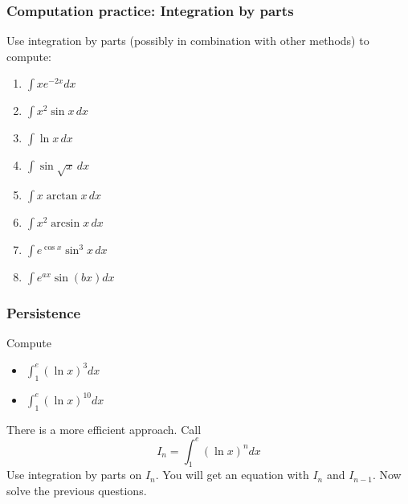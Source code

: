 \documentclass[14pt]{beamer}
\newcommand {\DS} [1] {${\displaystyle #1}$}
\newcommand{\p}{\pause}
\newcommand{\vv}{\vspace{.2cm}}
\begin{document}
\begin{frame}[t]
\frametitle{Computation practice: Integration by parts}

Use integration by parts (possibly in combination with other methods) to compute:
\begin{multicols}{2}
	\begin{enumerate}
		\item  \DS{ \int x e^{-2x} dx }
		\vv
		\item \DS{\int x^2 \sin x \, dx}
		\vv
		\item \DS{\int  \ln x \, dx}
		\vv
		\item \DS{\int  \sin \sqrt{x} \, dx}
		\vv
\p		\item \DS{\int  x \arctan x \, dx}
		\vv
		\item \DS{\int  x^2 \arcsin x \, dx}
		\vv
		\item \DS{\int  e^{\cos x}  \sin^3 x \, dx}
		\vv
		\item \DS{\int  e^{ax} \sin (bx) dx}
		\vv
	\end{enumerate}
\end{multicols}

\end{frame}
\begin{frame}[t]
\frametitle{Persistence}
Compute
	\begin{multicols}{2}
	\begin{itemize}
		\item \DS{\int_1^e \left( \ln x \right)^3 dx}
\p
\vv
		\item \DS{\int_1^{e} \left( \ln x \right)^{10} dx}
	\end{itemize}
	\end{multicols}
\p
There is a more efficient approach.  Call
	$$
		I_n = \int_1^e \left( \ln x \right)^n dx
	$$
Use integration by parts on $I_n$.  You will get an equation with $I_n$ and $I_{n-1}$.
Now solve the previous questions.

\vfill
\hfill
\href{https://oeis.org/}{}

\end{frame}
\end{document}
